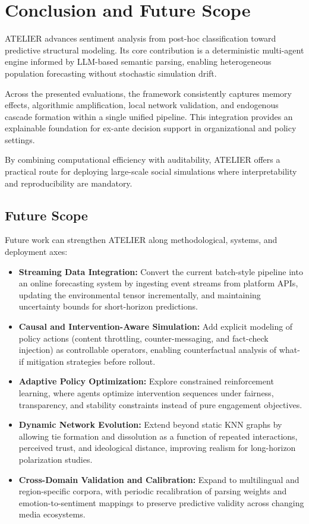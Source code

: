 \documentclass[12pt]{IEEEtran}
\begin{document}
\section{Conclusion and Future Scope}
\label{sec:conclusion}

ATELIER advances sentiment analysis from post-hoc classification toward predictive structural modeling. Its core contribution is a deterministic multi-agent engine informed by LLM-based semantic parsing, enabling heterogeneous population forecasting without stochastic simulation drift.

Across the presented evaluations, the framework consistently captures memory effects, algorithmic amplification, local network validation, and endogenous cascade formation within a single unified pipeline. This integration provides an explainable foundation for ex-ante decision support in organizational and policy settings.

By combining computational efficiency with auditability, ATELIER offers a practical route for deploying large-scale social simulations where interpretability and reproducibility are mandatory.

\subsection{Future Scope}
Future work can strengthen ATELIER along methodological, systems, and deployment axes:
\begin{itemize}
    \item \textbf{Streaming Data Integration:} Convert the current batch-style pipeline into an online forecasting system by ingesting event streams from platform APIs, updating the environmental tensor incrementally, and maintaining uncertainty bounds for short-horizon predictions.
    \item \textbf{Causal and Intervention-Aware Simulation:} Add explicit modeling of policy actions (content throttling, counter-messaging, and fact-check injection) as controllable operators, enabling counterfactual analysis of what-if mitigation strategies before rollout.
    \item \textbf{Adaptive Policy Optimization:} Explore constrained reinforcement learning, where agents optimize intervention sequences under fairness, transparency, and stability constraints instead of pure engagement objectives.
    \item \textbf{Dynamic Network Evolution:} Extend beyond static KNN graphs by allowing tie formation and dissolution as a function of repeated interactions, perceived trust, and ideological distance, improving realism for long-horizon polarization studies.
    \item \textbf{Cross-Domain Validation and Calibration:} Expand to multilingual and region-specific corpora, with periodic recalibration of parsing weights and emotion-to-sentiment mappings to preserve predictive validity across changing media ecosystems.
\end{itemize}
\end{document}
